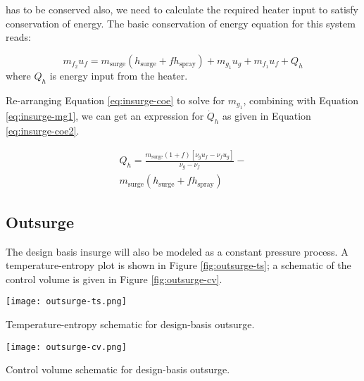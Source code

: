  has to be conserved also, we need to calculate the required heater input to satisfy conservation of energy.  The basic conservation of energy equation for this system reads:


\begin{equation}
m_{f_2} u_f = m_{\text{surge}}(h_{\text{surge}} + fh_{\text{spray}}) + m_{g_1}u_g + m_{f_1}u_f + Q_h 
\label{eq:insurge-coe}
\end{equation}
where $Q_h$ is energy input from the heater.

Re-arranging Equation \ref{eq:insurge-coe} to solve for $m_{g_1}$, combining with Equation \ref{eq:insurge-mg1}, we can get an expression for $\dot{Q}_{h}$ as given in Equation \ref{eq:insurge-coe2}.

\begin{multline}
Q_h = \frac{m_{\text{surge}}(1+f)\left[\nu_g u_f - \nu_f u_g\right]  }{\nu_g - \nu_f} - \\ m_{\text{surge}} (h_{\text{surge}}+fh_{\text{spray}})
\label{eq:insurge-coe2}
\end{multline}


\subsection{Outsurge}
The design basis insurge will also be modeled as a constant pressure process.  A temperature-entropy plot is shown in Figure \ref{fig:outsurge-ts}; a schematic of the control volume is given in Figure \ref{fig:outsurge-cv}.
\begin{marginfigure}
\texttt{[image: outsurge-ts.png]}
\caption{Temperature-entropy schematic for design-basis outsurge.}
\label{fig:outsurge-ts}
\end{marginfigure}

\begin{marginfigure}
\texttt{[image: outsurge-cv.png]}
\caption{Control volume schematic for design-basis outsurge.}
\label{fig:outsurge-cv}
\end{marginfigure}

